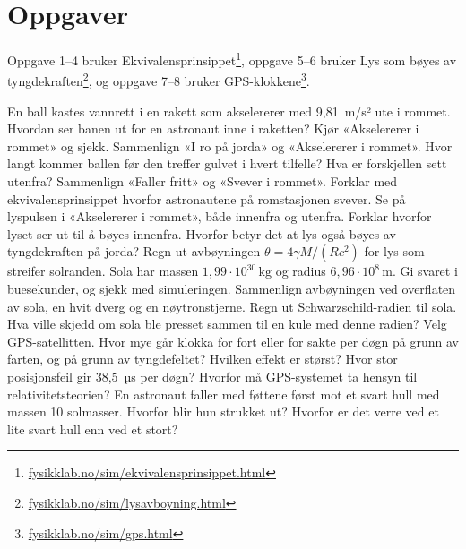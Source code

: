 \documentclass[11pt]{article}
\begin{document}

\section*{Oppgaver}

Oppgave 1–4 bruker Ekvivalensprinsippet\footnote{\url{fysikklab.no/sim/ekvivalensprinsippet.html}}, oppgave 5–6 bruker Lys som bøyes av tyngdekraften\footnote{\url{fysikklab.no/sim/lysavboyning.html}}, og oppgave 7–8 bruker GPS-klokkene\footnote{\url{fysikklab.no/sim/gps.html}}.

\begin{oppgaveliste}
\oppgave {}En ball kastes vannrett i en rakett som akselererer med 9,81~m/s² ute i rommet. Hvordan ser banen ut for en astronaut inne i raketten? Kjør «Akselererer i rommet» og sjekk.
\svar
\oppgave {}Sammenlign «I ro på jorda» og «Akselererer i rommet». Hvor langt kommer ballen før den treffer gulvet i hvert tilfelle? Hva er forskjellen sett utenfra?
\svar
\oppgave {}Sammenlign «Faller fritt» og «Svever i rommet». Forklar med ekvivalensprinsippet hvorfor astronautene på romstasjonen svever.
\svar
\oppgave {}Se på lyspulsen i «Akselererer i rommet», både innenfra og utenfra. Forklar hvorfor lyset ser ut til å bøyes innenfra. Hvorfor betyr det at lys også bøyes av tyngdekraften på jorda?
\svar
\oppgave {}Regn ut avbøyningen $θ = 4γM/(Rc^{2})$ for lys som streifer solranden. Sola har massen $1{,}99 \cdot 10^{30}\,\mathrm{kg}$ og radius $6{,}96 \cdot 10^{8}\,\mathrm{m}$. Gi svaret i buesekunder, og sjekk med simuleringen.
\svar
\oppgave {}Sammenlign avbøyningen ved overflaten av sola, en hvit dverg og en nøytronstjerne. Regn ut Schwarzschild-radien til sola. Hva ville skjedd om sola ble presset sammen til en kule med denne radien?
\svar
\oppgave {}Velg GPS-satellitten. Hvor mye går klokka for fort eller for sakte per døgn på grunn av farten, og på grunn av tyngdefeltet? Hvilken effekt er størst?
\svar
\oppgave {}Hvor stor posisjonsfeil gir 38,5~µs per døgn? Hvorfor må GPS-systemet ta hensyn til relativitetsteorien?
\svar
\oppgave {}En astronaut faller med føttene først mot et svart hull med massen 10 solmasser. Hvorfor blir hun strukket ut? Hvorfor er det verre ved et lite svart hull enn ved et stort?
\svar
\end{oppgaveliste}
\end{document}
